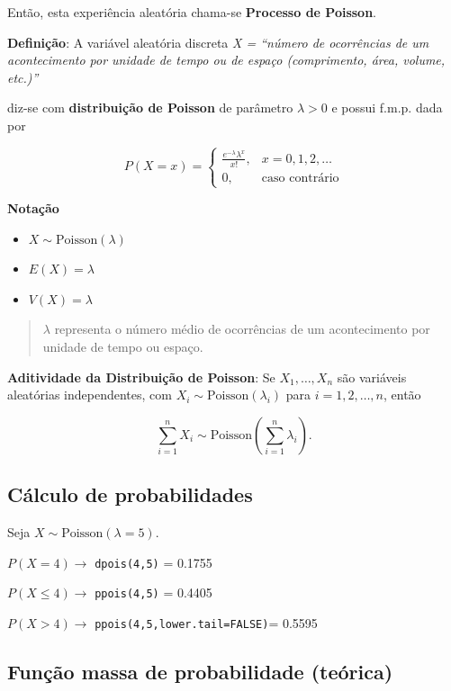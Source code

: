 \documentclass[
]{book}
\providecommand{\tightlist}{%
  \setlength{\itemsep}{0pt}\setlength{\parskip}{0pt}}
\begin{document}
Então, esta experiência aleatória chama-se \textbf{Processo de Poisson}.

\textbf{Definição}: A variável aleatória discreta \emph{X = ``número de ocorrências de um acontecimento por unidade de tempo ou de espaço (comprimento, área, volume, etc.)''}

diz-se com \textbf{distribuição de Poisson} de parâmetro \(\lambda > 0\) e possui f.m.p. dada por

\[
P(X = x) = \begin{cases} 
\frac{e^{-\lambda} \lambda^x}{x!}, & x = 0, 1, 2, \dots \\
0, & \text{caso contrário}
\end{cases}
\]

\textbf{Notação}

\begin{itemize}
\tightlist
\item
  \(X \sim \text{Poisson}(\lambda)\)
\item
  \(E(X) = \lambda\)
\item
  \(V(X) = \lambda\)
\end{itemize}

\begin{quote}
\(\lambda\) representa o número médio de ocorrências de um acontecimento por unidade de tempo ou espaço.
\end{quote}

\textbf{Aditividade da Distribuição de Poisson}: Se \(X_1, \dots, X_n\) são variáveis aleatórias independentes, com \(X_i \sim \text{Poisson}(\lambda_i)\) para \(i = 1, 2, \dots, n\), então

\[
\sum_{i=1}^n X_i \sim \text{Poisson}\left( \sum_{i=1}^n \lambda_i \right).
\]

\subsection{Cálculo de probabilidades}\label{cuxe1lculo-de-probabilidades-3}

Seja \(X\sim\text{Poisson}(\lambda=5)\).

\(P(X =4) \to\) \texttt{dpois(4,5)} = 0.1755

\noindent \(P(X\leq 4) \to\) \texttt{ppois(4,5)} = 0.4405

\noindent \(P(X > 4)\to\) \texttt{ppois(4,5,lower.tail=FALSE)}= 0.5595

\subsection{Função massa de probabilidade (teórica)}\label{funuxe7uxe3o-massa-de-probabilidade-teuxf3rica-1}
\end{document}
